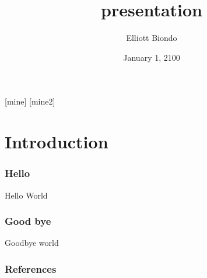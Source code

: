 \documentclass[12pt]{beamer}
\begin{document}
[mine]
[mine2]

\title{presentation}   
\author{Elliott Biondo}
\date{January 1, 2100}
\frame[plain]{\titlepage \addtocounter{framenumber}{-1}} 
\section{Introduction}
\begin{frame}[fragile]
\frametitle{Hello}
Hello World \cite{Kalos_Whitlock}
\end{frame}
\begin{frame}[fragile]
\frametitle{Good bye}
Goodbye world
\end{frame}
\begin{frame}[plain]
        \tiny
        \frametitle{References}
        
        \color{black}
        
\end{frame}

\end{document}
